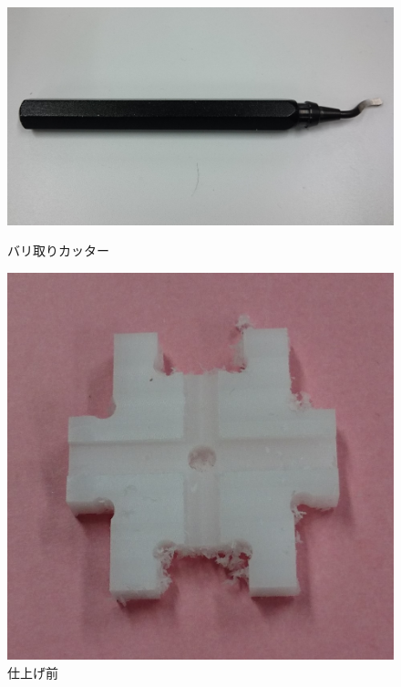 \documentclass[b5paper, 9pt, twocolumn, titlepage,openany]{jsbook}%
\begin{document}
\begin{figure}[tbh]
  \begin{center}
    \begin{minipage}{0.6\columnwidth}
      \includegraphics[width=\columnwidth]{baritori.jpg}
    \end{minipage}
    \caption{バリ取りカッター\label{baritori}}
  \end{center}
  \begin{center}
    \begin{minipage}{0.6\columnwidth}
      \includegraphics[width=\columnwidth]{parts_bari.jpg}
    \end{minipage}
    \caption{仕上げ前\label{parts_bari}}
  \end{center}
\end{figure}
\end{document}
